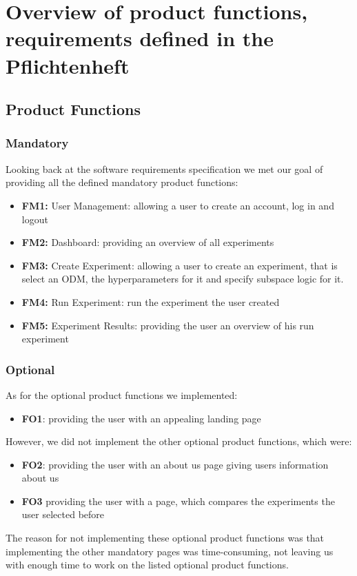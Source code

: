 \section{Overview of product functions, requirements defined in the Pflichtenheft}
\subsection*{Product Functions}
\subsubsection*{Mandatory}
Looking back at the software requirements specification we met our goal of providing all the defined mandatory product functions:
\begin{itemize}
    \item \textbf{FM1:} User Management: allowing a user to create an account, log in and logout
    \item \textbf{FM2:} Dashboard: providing an overview of all experiments
    \item \textbf{FM3:} Create Experiment: allowing a user to create an experiment, that is select an ODM, the hyperparameters for it and specify subspace logic for it.
    \item \textbf{FM4:} Run Experiment: run the experiment the user created
    \item \textbf{FM5:} Experiment Results: providing the user an overview of his run experiment
\end{itemize}
\subsubsection*{Optional}
As for the optional product functions we implemented:
\begin{itemize}
    \item \textbf{FO1}: providing the user with an appealing landing page 
\end{itemize}
However, we did not implement the other optional product functions, which were:
\begin{itemize}
    \item \textbf{FO2}: providing the user with an about us page giving users information about us
    \item \textbf{FO3} providing the user with a page, which compares the experiments the user selected before
\end{itemize}
The reason for not implementing these optional product functions was that implementing the other mandatory pages was time-consuming, not leaving us with enough time to work on the listed optional product functions.


